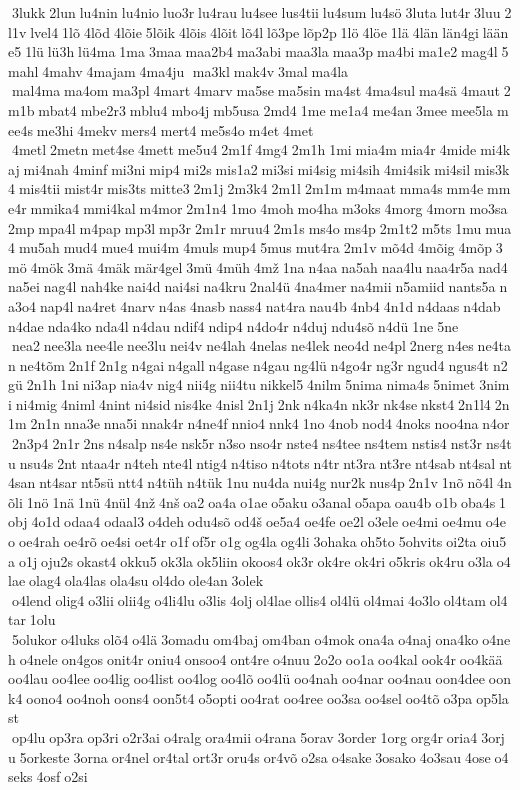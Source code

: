  3lukk 2lun lu4nin lu4nio luo3r lu4rau lu4see lus4tii lu4sum lu4sö 3luta lut4r 3luu 2l1v lvel4 1lõ 4lõd 4lõie 5lõik 4lõis 4lõit lõ4l lõ3pe lõp2p 1lö 4löe 1lä 4län län4gi lääne5 1lü lü3h lü4ma 1ma 3maa maa2b4 ma3abi maa3la maa3p ma4bi ma1e2 mag4l 5mahl 4mahv 4majam 4ma4ju  ma3kl mak4v 3mal ma4la  mal4ma ma4om ma3pl 4mart 4marv ma5se ma5sin ma4st 4ma4sul ma4sä 4maut 2m1b mbat4 mbe2r3 mblu4 mbo4j mb5usa 2md4 1me me1a4 me4an 3mee mee5la mee4s me3hi 4mekv mers4 mert4 me5s4o m4et 4met  4metl 2metn met4se 4mett me5u4 2m1f 4mg4 2m1h 1mi mia4m mia4r 4mide mi4kaj mi4nah 4minf mi3ni mip4 mi2s mis1a2 mi3si mi4sig mi4sih 4mi4sik mi4sil mis3k4 mis4tii mist4r mis3ts mitte3 2m1j 2m3k4 2m1l 2m1m m4maat mma4s mm4e mme4r mmika4 mmi4kal m4mor 2m1n4 1mo 4moh mo4ha m3oks 4morg 4morn mo3sa 2mp mpa4l m4pap mp3l mp3r 2m1r mruu4 2m1s ms4o ms4p 2m1t2 m5ts 1mu mua4 mu5ah mud4 mue4 mui4m 4muls mup4 5mus mut4ra 2m1v mõ4d 4mõig 4mõp 3mö 4mök 3mä 4mäk mär4gel 3mü 4müh 4mž 1na n4aa na5ah naa4lu naa4r5a nad4 na5ei nag4l nah4ke nai4d nai4si na4kru 2nal4ü 4na4mer na4mii n5amiid nants5a na3o4 nap4l na4ret 4narv n4as 4nasb nass4 nat4ra nau4b 4nb4 4n1d n4daas n4dab n4dae nda4ko nda4l n4dau ndif4 ndip4 n4do4r n4duj ndu4sõ n4dü 1ne 5ne  nea2 nee3la nee4le nee3lu nei4v ne4lah 4nelas ne4lek neo4d ne4pl 2nerg n4es ne4tan ne4tõm 2n1f 2n1g n4gai n4gall n4gase n4gau ng4lü n4go4r ng3r ngud4 ngus4t n2gü 2n1h 1ni ni3ap nia4v nig4 nii4g nii4tu nikkel5 4nilm 5nima nima4s 5nimet 3nimi ni4mig 4niml 4nint ni4sid nis4ke 4nisl 2n1j 2nk n4ka4n nk3r nk4se nkst4 2n1l4 2n1m 2n1n nna3e nna5i nnak4r n4ne4f nnio4 nnk4 1no 4nob nod4 4noks noo4na n4or 2n3p4 2n1r 2ns n4salp ns4e nsk5r n3so nso4r nste4 ns4tee ns4tem nstis4 nst3r ns4tu nsu4s 2nt ntaa4r n4teh nte4l ntig4 n4tiso n4tots n4tr nt3ra nt3re nt4sab nt4sal nt4san nt4sar nt5sü ntt4 n4tüh n4tük 1nu nu4da nui4g nur2k nus4p 2n1v 1nõ nõ4l 4nõli 1nö 1nä 1nü 4nül 4nž 4nš oa2 oa4a o1ae o5aku o3anal o5apa oau4b o1b oba4s 1obj 4o1d odaa4 odaal3 o4deh odu4sõ od4š oe5a4 oe4fe oe2l o3ele oe4mi oe4mu o4eo oe4rah oe4rõ oe4si oet4r o1f of5r o1g og4la og4li 3ohaka oh5to 5ohvits oi2ta oiu5a o1j oju2s okast4 okku5 ok3la ok5liin okoos4 ok3r ok4re ok4ri o5kris ok4ru o3la o4lae olag4 ola4las ola4su ol4do ole4an 3olek  o4lend olig4 o3lii olii4g o4li4lu o3lis 4olj ol4lae ollis4 ol4lü ol4mai 4o3lo ol4tam ol4tar 1olu  5olukor o4luks olõ4 o4lä 3omadu om4baj om4ban o4mok ona4a o4naj ona4ko o4neh o4nele on4gos onit4r oniu4 onsoo4 ont4re o4nuu 2o2o oo1a oo4kal ook4r oo4kää oo4lau oo4lee oo4lig oo4list oo4log oo4lõ oo4lü oo4nah oo4nar oo4nau oon4dee oonk4 oono4 oo4noh oons4 oon5t4 o5opti oo4rat oo4ree oo3sa oo4sel oo4tõ o3pa op5last  op4lu op3ra op3ri o2r3ai o4ralg ora4mii o4rana 5orav 3order 1org org4r oria4 3orju 5orkeste 3orna or4nel or4tal ort3r oru4s or4võ o2sa o4sake 3osako 4o3sau 4ose o4seks 4osf o2si 